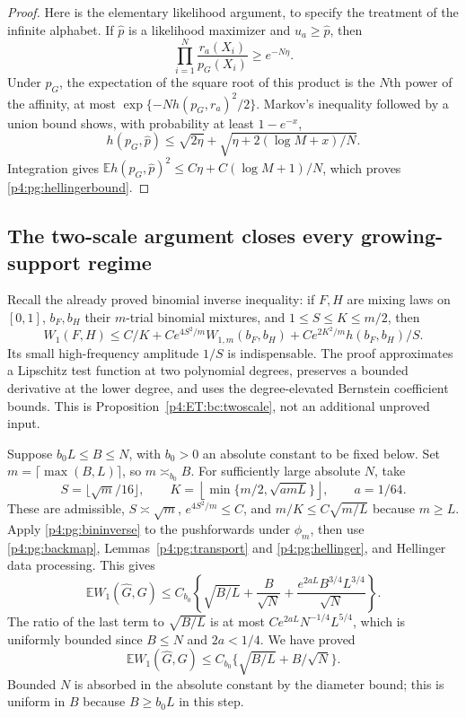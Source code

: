 \documentclass[11pt,a4paper]{article}
\theoremstyle{definition}
\theoremstyle{remark}
\numberwithin{equation}{section}
\begin{document}
\begin{proof}
Here is the elementary likelihood argument, to specify the treatment
of the infinite alphabet.  If $\widehat p$ is a likelihood maximizer
and $u_a\ge\widehat p$, then
\[
 \prod_{i=1}^N\frac{r_a(X_i)}{p_G(X_i)}\ge e^{-N\eta}.
\]
Under $p_G$, the expectation of the square root of this product is
the $N$th power of the affinity, at most
$\exp\{-Nh(p_G,r_a)^2/2\}$.  Markov's inequality followed by a
union bound shows, with probability at least $1-e^{-x}$,
\[
 h(p_G,\widehat p)\le\sqrt{2\eta}
       +\sqrt{\eta+2(\log M+x)/N}.
\]
Integration gives
$\mathbb E h(p_G,\widehat p)^2\le C\eta+C(\log M+1)/N$,
which proves \eqref{p4:pg:hellingerbound}.
\end{proof}

\subsection{The two-scale argument closes every growing-support regime}

Recall the already proved binomial inverse inequality: if $F,H$ are
mixing laws on $[0,1]$, $b_F,b_H$ their $m$-trial binomial mixtures,
and $1\le S\le K\le m/2$, then
\begin{equation}\label{p4:pg:bininverse}
 W_1(F,H)\le C/K+Ce^{4S^2/m}W_{1,m}(b_F,b_H)
                      +Ce^{2K^2/m}h(b_F,b_H)/S.
\end{equation}
Its small high-frequency amplitude $1/S$ is indispensable.
The proof approximates a Lipschitz test function at two polynomial
degrees, preserves a bounded derivative at the lower degree, and
uses the degree-elevated Bernstein coefficient bounds.  This is
Proposition~\ref{p4:ET:bc:twoscale}, not an additional unproved input.

Suppose $b_0L\le B\le N$, with $b_0>0$ an absolute constant to
be fixed below.  Set $m=\lceil\max(B,L)\rceil$, so $m\asymp_{b_0}B$.
For sufficiently large absolute $N$, take
\[
 S=\lfloor\sqrt m/16\rfloor,\qquad
 K=\left\lfloor\min\{m/2,\sqrt{a mL}\}\right\rfloor,
 \qquad a=1/64.
\]
These are admissible, $S\asymp\sqrt m$, $e^{4S^2/m}\le C$, and
$m/K\le C\sqrt{m/L}$ because $m\ge L$.
Apply \eqref{p4:pg:bininverse} to the pushforwards under $\phi_m$,
then use \eqref{p4:pg:backmap}, Lemmas~\ref{p4:pg:transport} and
\ref{p4:pg:hellinger}, and Hellinger data processing.  This gives
\[
 \mathbb E W_1(\widehat G,G)
 \le C_{b_0}\left\{
 \sqrt{B/L}+\frac B{\sqrt N}
       +\frac{e^{2aL}B^{3/4}L^{3/4}}{\sqrt N}\right\}.
\]
The ratio of the last term to $\sqrt{B/L}$ is at most
$C e^{2aL}N^{-1/4}L^{5/4}$, which is uniformly bounded since
$B\le N$ and $2a<1/4$.  We have proved
\begin{equation}\label{p4:pg:medium}
 \mathbb E W_1(\widehat G,G)
                  \le C_{b_0}\{\sqrt{B/L}+B/\sqrt N\}.
\end{equation}
Bounded $N$ is absorbed in the absolute constant by the diameter
bound; this is uniform in $B$ because $B\ge b_0L$ in this step.
\end{document}
